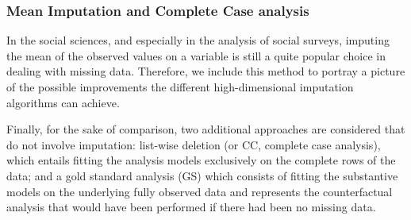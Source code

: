 \subsubsection{Mean Imputation and Complete Case analysis}
	In the social sciences, and especially in the analysis of social surveys, imputing the mean of the observed values 
	on a variable is still a quite popular choice in dealing with missing data. 
	Therefore, we include this method to portray a picture of the possible improvements the different high-dimensional
	imputation algorithms can achieve.
	
	Finally, for the sake of comparison, two additional approaches are considered that do not involve imputation: 
	list-wise deletion (or CC, complete case analysis), which entails fitting the analysis models exclusively on 
	the complete rows of the data; 
	and a gold standard analysis (GS) which consists of fitting the substantive models on the underlying fully 
	observed data and represents the counterfactual analysis that would have been performed if there had been 
	no missing data.
	
	

